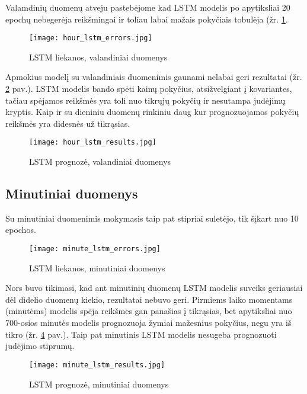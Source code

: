 \documentclass[12pt,a4paper]{article}
\begin{document}
Valamdinių duomenų atveju pastebėjome kad LSTM modelis po apytiksliai 20 epochų nebegerėja reikšmingai ir toliau labai mažais pokyčiais tobulėja (žr. \ref{hourlstmerrors}.

\begin{figure}[!h]
\centering
\caption{LSTM liekanos, valandiniai duomenys}
\label{hourlstmerrors}
\texttt{[image: hour\_lstm\_errors.jpg]}
\end{figure}

Apmokius modelį su valandiniais duomenimis gaunami nelabai geri rezultatai (žr. \ref{hourlstmpreds} pav.). LSTM modelis bando spėti kainų pokyčius, atsižvelgiant į kovariantes, tačiau spėjamos reikšmės yra toli nuo tikrųjų pokyčių ir nesutampa judėjimų kryptis. Kaip ir su dieniniu duomenų rinkiniu daug kur prognozuojamos pokyčių reikšmės yra didesnės už tikrąsias.

\begin{figure}[!h]
\centering
\caption{LSTM prognozė, valandiniai duomenys}
\label{hourlstmpreds}
\texttt{[image: hour\_lstm\_results.jpg]}
\end{figure}
\clearpage

\subsection{Minutiniai duomenys}

Su minutiniai duomenimis mokymasis taip pat stipriai suletėjo, tik šįkart nuo 10 epochos.

\begin{figure}[!h]
\centering
\caption{LSTM liekanos, minutiniai duomenys}
\label{minutelstmerrors}
\texttt{[image: minute\_lstm\_errors.jpg]}
\end{figure}

Nors buvo tikimasi, kad ant minutinių duomenų LSTM modelis suveiks geriausiai dėl didelio duomenų kiekio, rezultatai nebuvo geri. Pirmiems laiko momentams (minutėms) modelis spėja reikšmes gan panašias į tikrąsias, bet apytiksliai nuo 700-osios minutės modelis prognozuoja žymiai mažesnius pokyčius, negu yra iš tikro (žr. \ref{minutelstmpreds} pav.). Taip pat minutinis LSTM modelis nesugeba prognozuoti judėjimo stiprumų.

\begin{figure}[!h]
\centering
\caption{LSTM prognozė, minutiniai duomenys}
\label{minutelstmpreds}
\texttt{[image: minute\_lstm\_results.jpg]}
\end{figure}
\end{document}
